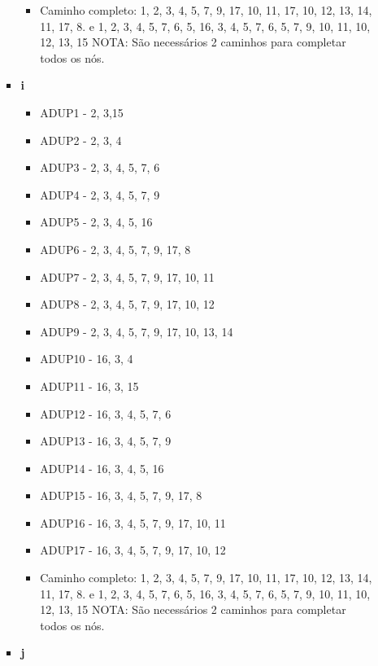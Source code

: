 \documentclass{article}
\begin{document}
\begin{itemize}
\begin{enumerate}
\begin{itemize}
\begin{itemize}
            \item Caminho completo: 1, 2, 3, 4, 5, 7, 9, 17, 10, 11, 17, 10, 12, 13, 14, 11, 17, 8. e
            1, 2, 3, 4, 5, 7, 6, 5, 16, 3, 4, 5, 7, 6, 5, 7, 9, 10, 11, 10, 12, 13, 15\newline
           NOTA: São necessários 2 caminhos para completar todos os nós.\newline
        \end{itemize}
        \item \textbf{i}
        \begin{itemize}
            \item ADUP1 - 2, 3,15
            \item ADUP2 - 2, 3, 4
            \item ADUP3 - 2, 3, 4, 5, 7, 6
            \item ADUP4 - 2, 3, 4, 5, 7, 9
            \item ADUP5 - 2, 3, 4, 5, 16
            \item ADUP6 - 2, 3, 4, 5, 7, 9, 17, 8
            \item ADUP7 - 2, 3, 4, 5, 7, 9, 17, 10, 11
            \item ADUP8 - 2, 3, 4, 5, 7, 9, 17, 10, 12
            \item ADUP9 - 2, 3, 4, 5, 7, 9, 17, 10, 13, 14
            \item ADUP10 - 16, 3, 4
            \item ADUP11 - 16, 3, 15
            \item ADUP12 - 16, 3, 4, 5, 7, 6
            \item ADUP13 - 16, 3, 4, 5, 7, 9
            \item ADUP14 - 16, 3, 4, 5, 16
            \item ADUP15 - 16, 3, 4, 5, 7, 9, 17, 8
            \item ADUP16 - 16, 3, 4, 5, 7, 9, 17, 10, 11
            \item ADUP17 - 16, 3, 4, 5, 7, 9, 17, 10, 12
            \item Caminho completo: 1, 2, 3, 4, 5, 7, 9, 17, 10, 11, 17, 10, 12, 13, 14, 11, 17, 8. e
            1, 2, 3, 4, 5, 7, 6, 5, 16, 3, 4, 5, 7, 6, 5, 7, 9, 10, 11, 10, 12, 13, 15\newline
           NOTA: São necessários 2 caminhos para completar todos os nós.\newline
         \end{itemize}
        \item \textbf{j}
        \begin{itemize}

\end{itemize}
\end{itemize}
\end{enumerate}
\end{itemize}
\end{document}
